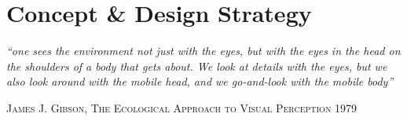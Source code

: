 \pagebreak
\chapter{Concept \& Design Strategy}
\label{ch:concept}


\begin{flushright}
\textit{
``one sees the environment not just with the eyes, but with the eyes in the head on the shoulders of a body that gets about. We look at details with the eyes, but we also look around with the mobile head, and we go-and-look with the mobile body''}
\par\hfill\textsc{James J. Gibson, The Ecological Approach to Visual Perception 1979}


\end{flushright}
\vspace{15pt}

